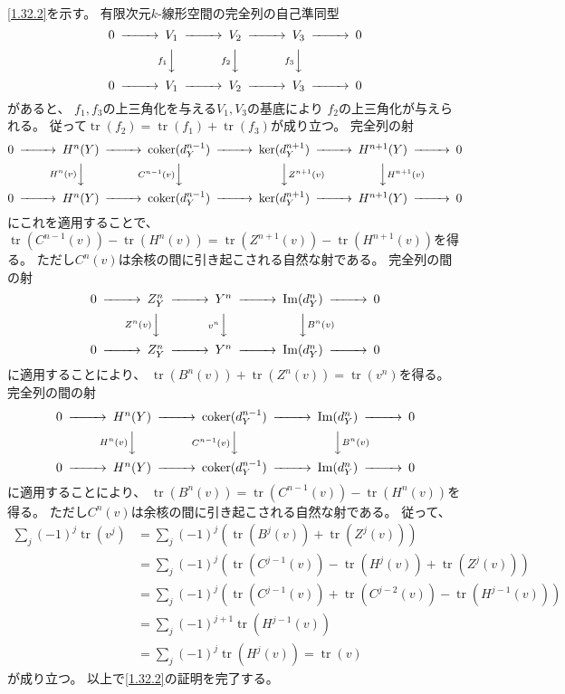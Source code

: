 \documentclass[uplatex,dvipdfmx]{jsarticle}
\makeatletter
\theoremstyle{definition}
\renewenvironment{proof}[1][\proofname]{
  \pushQED{\qed}%
  \normalfont \topsep6\p@\@plus6\p@\relax
  \trivlist
  \item[\hskip\labelsep
    #1\@addpunct{\textbf{.}}]\ignorespaces
}{%
  \popQED\endtrivlist\@endpefalse
}
\providecommand{\proofname}{証明}
\DeclareMathOperator{\im}{\mathrm{Im}}
\DeclareMathOperator{\coker}{\mathrm{coker}}
\DeclareMathOperator{\tr}{\mathrm{tr}}
\makeatother
\begin{document}
\begin{proof}
  \ref{1.32.2}を示す。
  有限次元\(k\)-線形空間の完全列の自己準同型
  \[
  \begin{CD}
    0 @>>> V_1 @>>> V_2 @>>> V_3 @>>> 0 \\
    @. @V f_1 VV @V f_2 VV @V f_3 VV @. \\
    0 @>>> V_1 @>>> V_2 @>>> V_3 @>>> 0
  \end{CD}
  \]
  があると、
  \(f_1,f_3\)の上三角化を与える\(V_1,V_3\)の基底により
  \(f_2\)の上三角化が与えられる。
  従って\(\tr(f_2) = \tr(f_1) + \tr(f_3)\)が成り立つ。
  完全列の射
  \[
  \begin{CD}
    0 @>>> H^n(Y) @>>> \coker(d_Y^{n-1}) @>>> \ker(d_Y^{n+1}) @>>> H^{n+1}(Y) @>>> 0 \\
    @. @V{H^n(v)}VV @V{C^{n-1}(v)}VV @VV{Z^{n+1}(v)}V @VV{H^{n+1}(v)}V @. \\
    0 @>>> H^n(Y) @>>> \coker(d_Y^{n-1}) @>>> \ker(d_Y^{n+1}) @>>> H^{n+1}(Y) @>>> 0
  \end{CD}
  \]
  にこれを適用することで、
  \(\tr(C^{n-1}(v)) - \tr(H^n(v)) = \tr(Z^{n+1}(v)) - \tr(H^{n+1}(v))\)を得る。
  ただし\(C^n(v)\)は余核の間に引き起こされる自然な射である。
  完全列の間の射
  \[
  \begin{CD}
    0 @>>> Z_Y^n @>>> Y^n @>>> \im(d_Y^n) @>>> 0 \\
    @. @V{Z^n(v)}VV @V{v^n}VV @VV{B^n(v)}V @. \\
    0 @>>> Z_Y^n @>>> Y^n @>>> \im(d_Y^n) @>>> 0
  \end{CD}
  \]
  に適用することにより、
  \(\tr(B^n(v)) + \tr(Z^n(v)) = \tr(v^n)\)を得る。
  完全列の間の射
  \[
  \begin{CD}
    0 @>>> H^n(Y) @>>> \coker(d_Y^{n-1}) @>>> \im(d_Y^n) @>>> 0 \\
    @. @V{H^n(v)}VV @V{C^{n-1}(v)}VV @VV{B^n(v)}V @. \\
    0 @>>> H^n(Y) @>>> \coker(d_Y^{n-1}) @>>> \im(d_Y^n) @>>> 0
  \end{CD}
  \]
  に適用することにより、
  \(\tr(B^n(v)) = \tr(C^{n-1}(v)) - \tr(H^n(v))\)を得る。
  ただし\(C^n(v)\)は余核の間に引き起こされる自然な射である。
  従って、
  \begin{align*}
    \sum_j (-1)^j\tr(v^j)
    &= \sum_j (-1)^j\left( \tr(B^j(v)) + \tr(Z^j(v)) \right) \\
    &= \sum_j (-1)^j\left( \tr(C^{j-1}(v)) - \tr(H^j(v)) + \tr(Z^j(v)) \right) \\
    &= \sum_j (-1)^j\left( \tr(C^{j-1}(v)) + \tr(C^{j-2}(v)) - \tr(H^{j-1}(v)) \right) \\
    &= \sum_j (-1)^{j+1}\tr(H^{j-1}(v)) \\
    &= \sum_j (-1)^j\tr(H^j(v)) = \tr(v)
  \end{align*}
  が成り立つ。
  以上で\ref{1.32.2}の証明を完了する。


\end{proof}
\end{document}

